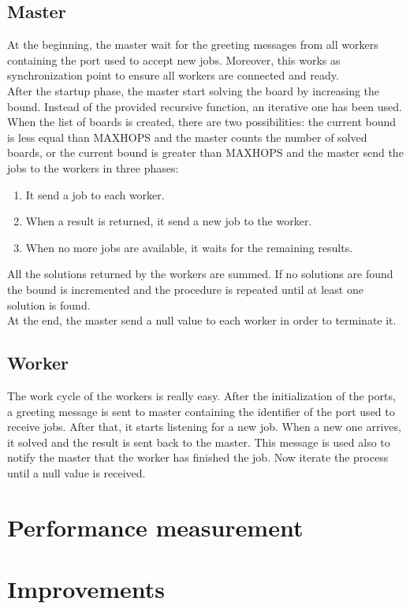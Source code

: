 \documentclass{article}
\begin{document}
\subsection{Master} \label{sec:master}
At the beginning, the master wait for the greeting messages from all workers containing the port used to accept new jobs. Moreover, this works as synchronization point to ensure all workers are connected and ready. \\
After the startup phase, the master start solving the board by increasing the bound. Instead of the provided recursive function, an iterative one has been used. When the list of boards is created, there are two possibilities: the current bound is less equal than MAXHOPS and the master counts the number of solved boards, or the current bound is greater than MAXHOPS and the master send the jobs to the workers in three phases:
\begin{enumerate}
    \item It send a job to each worker.
    \item When a result is returned, it send a new job to the worker.
    \item When no more jobs are available, it waits for the remaining results.
\end{enumerate}
All the solutions returned by the workers are summed. If no solutions are found the bound is incremented and the procedure is repeated until at least one solution is found. \\
At the end, the master send a null value to each worker in order to terminate it.


\subsection{Worker}
The work cycle of the workers is really easy. After the initialization of the ports, a greeting message is sent to master containing the identifier of the port used to receive jobs. After that, it starts listening for a new job. When a new one arrives, it solved and the result is sent back to the master. This message is used also to notify the master that the worker has finished the job. Now iterate the process until a null value is received.


\section{Performance measurement}

\section{Improvements}
\end{document}
